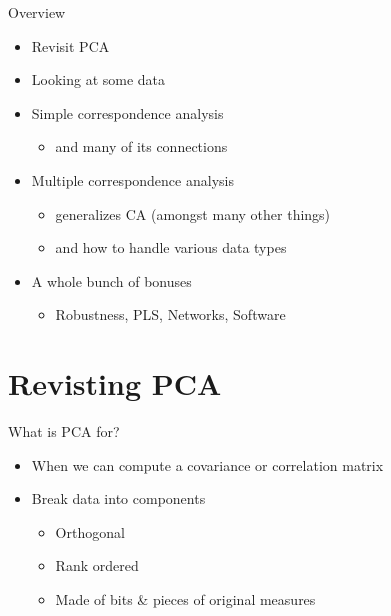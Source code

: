 \documentclass[
  ignorenonframetext,
]{beamer}
\providecommand{\tightlist}{%
  \setlength{\itemsep}{0pt}\setlength{\parskip}{0pt}}
\begin{document}
\begin{frame}{Overview}
\protect\hypertarget{overview}{}

\begin{itemize}[<+->]
\tightlist
\item
  Revisit PCA
\item
  Looking at some data
\item
  Simple correspondence analysis

  \begin{itemize}[<+->]
  \tightlist
  \item
    and many of its connections
  \end{itemize}
\item
  Multiple correspondence analysis

  \begin{itemize}[<+->]
  \tightlist
  \item
    generalizes CA (amongst many other things)
  \item
    and how to handle various data types
  \end{itemize}
\item
  A whole bunch of bonuses

  \begin{itemize}[<+->]
  \tightlist
  \item
    Robustness, PLS, Networks, Software
  \end{itemize}
\end{itemize}

\end{frame}

\hypertarget{revisting-pca}{%
\section{Revisting PCA}\label{revisting-pca}}

\begin{frame}{What is PCA for?}
\protect\hypertarget{what-is-pca-for}{}

\begin{itemize}[<+->]
\tightlist
\item
  When we can compute a covariance or correlation matrix
\item
  Break data into components

  \begin{itemize}[<+->]
  \tightlist
  \item
    Orthogonal
  \item
    Rank ordered
  \item
    Made of bits \& pieces of original measures
  \end{itemize}
\end{itemize}

\end{frame}
\end{document}
